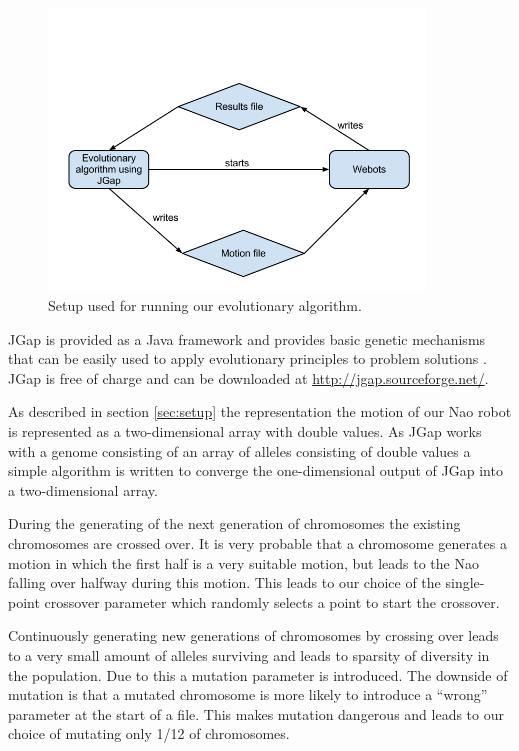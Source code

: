 \documentclass[a4paper,10pt]{article}
\begin{document}
\begin{figure}[h!]
\includegraphics[width=100mm]{images/jgapSetup}
\caption{Setup used for running our evolutionary algorithm.}
\label{fig:jgapsetup}
\end{figure}

JGap is provided as a Java framework and provides basic genetic mechanisms that can be easily used to apply evolutionary principles to problem solutions \cite{jgap}. JGap is free of charge and can be downloaded at \url{http://jgap.sourceforge.net/}. 

As described in section \ref{sec:setup} the representation the motion of our Nao robot is represented as a two-dimensional array with double values. As JGap works with a genome consisting of an array of alleles consisting of double values a simple algorithm is written to converge the one-dimensional output of JGap into a two-dimensional array. 

During the generating of the next generation of chromosomes the existing chromosomes are crossed over. It is very probable that a chromosome generates a motion in which the first half is a very suitable motion, but leads to the Nao falling over halfway during this motion. This leads to our choice of the single-point crossover parameter which randomly selects a point to start the crossover. 

Continuously generating new generations of chromosomes by crossing over leads to a very small amount of alleles surviving and leads to sparsity of diversity in the population. Due to this a mutation parameter is introduced. The downside of mutation is that a mutated chromosome is more likely to introduce a “wrong” parameter at the start of a file. This makes mutation dangerous and leads to our choice of mutating only 1/12 of chromosomes. 
\end{document}
